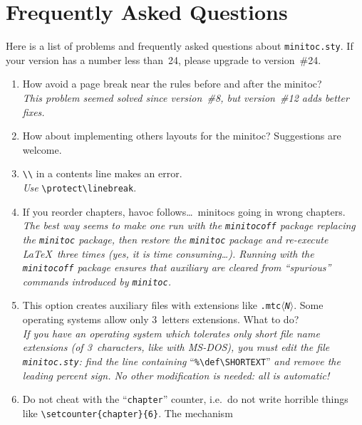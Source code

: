 \documentclass[12pt,a4paper]{book}
\def\Cat#1{\hbox{$\langle${\it #1\/}$\rangle$}}
\def\<#1>{\Cat{#1}}
\begin{document}
\chapter{Frequently Asked Questions}
Here is a list of problems and frequently asked questions about
{\tt minitoc.sty}. If your version has a number less than~24, please upgrade to
version~\#24.

\begin{enumerate}
\item
How avoid a page break near the rules before and after
the minitoc?\hfill\null\\
\emph{This problem seemed solved since version~\#8, but version~\#12
adds better fixes.}
\item
How about implementing others layouts for the minitoc? Suggestions are welcome.
\item\relax
\verb|\\|  in a contents line makes an error.\hfill\null\\
\emph{Use} \verb|\protect\linebreak|.
\item
If you reorder chapters, havoc follows\ldots\ minitocs
going in wrong chapters.\hfill\null\\
\emph{The best way seems to make one run with the {\tt minitocoff}
package replacing the {\tt minitoc} package, then restore
the\/ {\tt minitoc} package and re-execute \LaTeX\ three times
(yes, it is time consuming\ldots).
Running with the {\tt minitocoff} package ensures that auxiliary 
are cleared from ``spurious'' commands introduced by {\tt minitoc}.}
\item This option creates auxiliary files with extensions like {\tt.mtc\<N>}.
Some operating
systems allow only 3~letters extensions. What to do?\hfill\null\\
\emph{If you have an operating system which tolerates only
short file name extensions
(of 3~characters, like with MS-DOS), you must edit the file {\tt minitoc.sty}:
find the line containing} ``\/\verb|%\def\SHORTEXT|'' \emph{and remove
the leading percent sign. No other modification is needed: all is automatic!}
\item
Do not cheat with the ``{\tt chapter}'' counter, i.e.~do not
write horrible things like \verb|\setcounter{chapter}{6}|. The mechanism

\end{enumerate}
\end{document}
